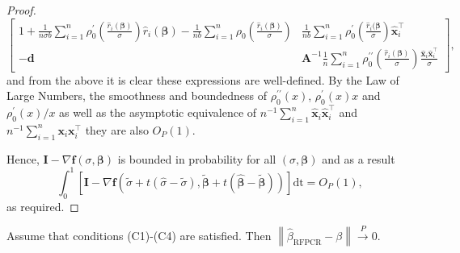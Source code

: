 \documentclass[11pt]{article}
\newenvironment{customprop}[1]
  {\renewcommand\theinnercustomprop{#1}\innercustomprop}
  {\endinnercustomprop}
\begin{document}
\begin{proof}
\begin{equation*}
\begin{bmatrix}
1+ \frac{1}{n \sigma b}\sum_{i=1}^n \rho_0^{\prime} \left( \frac{\widehat{r}_i(\boldsymbol{\beta})}{\sigma}\right)  \widehat{r}_i(\boldsymbol{\beta}) - \frac{1}{nb}\sum_{i=1}^n \rho_0\left(\frac{\widehat{r}_i(\boldsymbol{\beta})}{\sigma} \right)  
& \frac{1}{nb} \sum_{i=1}^n \rho_{0}^{\prime} \left( \frac{\widehat{r}_i(\boldsymbol{\beta}}{\sigma}\right)\mathbf{\widehat{x}}_i^{\top}\\ - \mathbf{d} & \mathbf{A}^{-1} \frac{1}{n} \sum_{i=1}^n \rho_0^{\prime \prime}\left( \frac{\widehat{r}_i\left(\boldsymbol{\beta} \right)}{\sigma} \right) \frac{\mathbf{\widehat{x}}_i \mathbf{\widehat{x}}_i^{\top}}{\sigma}\end{bmatrix},
\end{equation*}
and from the above it is clear these expressions are well-defined. By the Law of Large Numbers, the smoothness and boundedness of $\rho_0^{\prime \prime}(x)$, $\rho_0^{\prime}(x) x$ and $\rho_0^{\prime}(x)/x$ as well as the asymptotic equivalence of $n^{-1} \sum_{i=1}^n \mathbf{\widehat{x}}_i \mathbf{\widehat{x}}_i^{\top}$ and $n^{-1} \sum_{i=1}^n \mathbf{x}_i \mathbf{x}_i^{\top}$ they are also $O_{P}(1)$. 

Hence, $\mathbf{I} - \nabla \mathbf{f}(\sigma, \boldsymbol{\beta})$ is bounded in probability for all $\left( \sigma, \boldsymbol{\beta}\right)$ and as a result
\begin{equation}
\int_{0}^1 \left[ \mathbf{I}-    \nabla{\mathbf{f}} \left( \widetilde{\sigma} + t \left(\widehat{\sigma} - \widetilde{\sigma} \right),  \boldsymbol{\widetilde{\beta}} + t \left( \boldsymbol{\widehat{\beta}} - \boldsymbol{\widetilde{\beta}} \right) \right) \right] \mathrm{dt} = O_{P}(1),
\end{equation}
as required.

\end{proof}

\begin{customprop}{4.1}  Assume that conditions (C1)-(C4) are satisfied. Then $\left\| \widehat{\beta}_{{\scriptscriptstyle \text{RFPCR}}} - \beta \right\| \xrightarrow{P} 0$.
\end{customprop}
\end{document}
